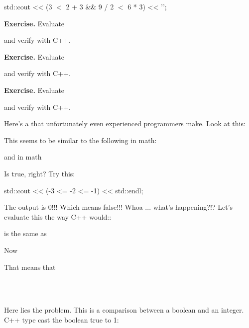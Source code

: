 {{{{{{\begin{console}
std::cout << (3 $<$ 2 + 3 && 9 / 2 $<$ 6 * 3) << '\n';
\end{console}

\textbf{Exercise.} Evaluate


and verify with C++.

\textbf{Exercise.} Evaluate


and verify with C++.

\textbf{Exercise.} Evaluate


and verify with C++.



Here's a  that unfortunately even experienced programmers make. Look at this:

This seems to be similar to the following in math:


and in math


Is true, right? Try this:
\begin{console}
std::cout << (-3 <= -2 <= -1) << std::endl;
\end{console}

The output is 0!!! Which means false!!! Whoa ... what's happening?!?
Let's evaluate this the way C++ would::


is the same as


Now


That means that

\\
\\

Here lies the problem. This is a comparison between a boolean and an
integer. C++ type cast the boolean true to 1:

}}}}}}
